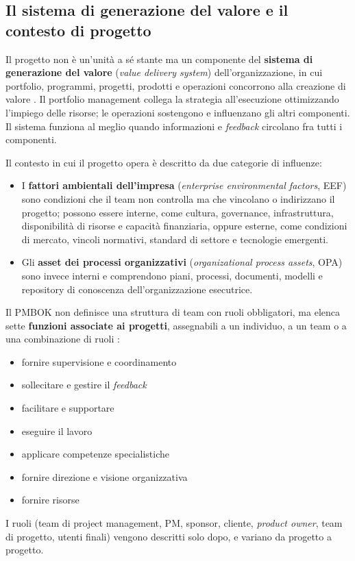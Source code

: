 \subsection{Il sistema di generazione del valore e il contesto di progetto}

Il progetto non \`e un'unit\`a a s\'e stante ma un componente del
\textbf{sistema di generazione del valore} (\emph{value delivery system})
dell'organizzazione, in cui portfolio, programmi, progetti, prodotti e
operazioni concorrono alla creazione di valore \cite{pmbok8}. Il portfolio
management collega la strategia all'esecuzione ottimizzando l'impiego delle
risorse; le operazioni sostengono e influenzano gli altri componenti. Il sistema
funziona al meglio quando informazioni e \emph{feedback} circolano fra tutti i
componenti.

Il contesto in cui il progetto opera \`e descritto da due categorie di
influenze:
\begin {itemize}
\item I \textbf{fattori ambientali dell'impresa} (\emph{enterprise
environmental factors}, EEF) sono condizioni che il team non controlla ma che
vincolano o indirizzano il progetto; possono essere interne, come cultura, governance,
infrastruttura, disponibilit\`a di risorse e capacit\`a finanziaria, oppure
esterne, come condizioni di mercato, vincoli normativi, standard di settore e
tecnologie emergenti.
\item Gli \textbf{asset dei processi organizzativi}
(\emph{organizational process assets}, OPA) sono invece interni e comprendono
piani, processi, documenti, modelli e repository di conoscenza
dell'organizzazione esecutrice.
\end {itemize}

Il PMBOK non definisce una struttura di team con ruoli obbligatori, ma elenca sette
\textbf{funzioni associate ai progetti}, assegnabili a un individuo, a un team o
a una combinazione di ruoli \cite{pmbok8}:
\begin {itemize}
\item fornire supervisione e coordinamento
\item sollecitare e gestire il \emph{feedback}
\item facilitare e supportare
\item eseguire il lavoro
\item applicare competenze specialistiche
\item fornire direzione e visione organizzativa
\item fornire risorse
\end {itemize}
I ruoli (team di project management, PM,
sponsor, cliente, \emph{product owner}, team di progetto, utenti finali)
vengono descritti solo dopo, e variano da progetto a progetto.

